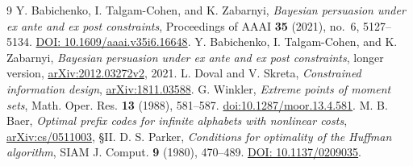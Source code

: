 \documentclass[11pt,a4paper]{amsart}
\begin{document}
\begin{thebibliography}{9}
Y. Babichenko, I. Talgam-Cohen, and K. Zabarnyi, \emph{Bayesian persuasion under ex ante and ex post constraints}, Proceedings of AAAI \textbf{35} (2021), no.~6, 5127--5134. \href{https://doi.org/10.1609/aaai.v35i6.16648}{DOI: 10.1609/aaai.v35i6.16648}.
Y. Babichenko, I. Talgam-Cohen, and K. Zabarnyi, \emph{Bayesian persuasion under ex ante and ex post constraints}, longer version, \href{https://arxiv.org/html/2012.03272v2}{arXiv:2012.03272v2}, 2021.
L. Doval and V. Skreta, \emph{Constrained information design}, \href{https://arxiv.org/abs/1811.03588}{arXiv:1811.03588}.
G. Winkler, \emph{Extreme points of moment sets}, Math. Oper. Res. \textbf{13} (1988), 581--587. \href{https://doi.org/10.1287/moor.13.4.581}{doi:10.1287/moor.13.4.581}.
M. B. Baer, \emph{Optimal prefix codes for infinite alphabets with nonlinear costs}, \href{https://arxiv.org/abs/cs/0511003}{arXiv:cs/0511003}, \S II.
D. S. Parker, \emph{Conditions for optimality of the Huffman algorithm}, SIAM J. Comput. \textbf{9} (1980), 470--489. \href{https://doi.org/10.1137/0209035}{DOI: 10.1137/0209035}.
\end{thebibliography}
\end{document}
